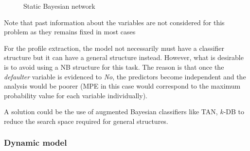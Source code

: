 \begin{figure}[h]

\centering
{}
\caption{Static Bayesian network}
\label{fig:staticBN}
\end{figure}


Note that past information about the variables are not considered for this problem as they remains fixed in most cases

For the profile extraction, the model not necessarily must have a classifier structure but it can have a general structure instead. However, what is desirable is to avoid using a NB structure for this task. The reason is that once the \emph{defaulter} variable is evidenced to \emph{No}, the predictors become independent and the analysis would be poorer (MPE in this case would correspond to the maximum probability value for each variable individually).

A solution could be the use of augmented Bayesian classifiers like TAN, $k$-DB to reduce the search space required for general structures.

\subsubsection*{Dynamic model}




